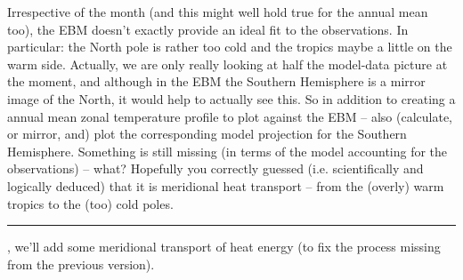 \documentclass{tufte-book} %
\begin{document}
Irrespective of the month (and this might well hold true for the annual mean too), the EBM doesn't exactly provide an ideal fit to the observations. In particular: the North pole is rather too cold and the tropics maybe a little on the warm side. Actually, we are only really looking at half the model-data picture at the moment, and although in the EBM the Southern Hemisphere is a mirror image of the North, it would help to actually see this. So in addition to creating a annual mean zonal temperature profile to plot against the EBM -- also (calculate, or mirror, and) plot the corresponding model projection for the Southern Hemisphere. Something is still missing (in terms of the model accounting for the observations) -- what? Hopefully you correctly guessed (i.e. scientifically and logically deduced) that it is meridional heat transport -- from the (overly) warm tropics to the (too) cold poles.

\vspace{1mm}
\noindent\rule{4cm}{0.5pt}
\vspace{-2mm}

,  we'll add some meridional transport of heat energy (to fix the process missing  from the previous version). 
\end{document}
